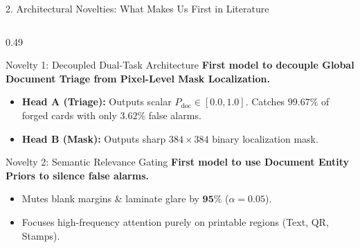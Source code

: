 \documentclass[aspectratio=169, 10pt]{beamer}
\begin{document}
\begin{frame}{2. Architectural Novelties: What Makes Us First in Literature}
  \begin{columns}[T]
    \begin{column}{0.49\textwidth}
      \begin{successbox}{Novelty 1: Decoupled Dual-Task Architecture}
        \textbf{First model to decouple Global Document Triage from Pixel-Level Mask Localization.}
        \begin{itemize}\scriptsize
          \item \textbf{Head A (Triage):} Outputs scalar $P_{\text{doc}} \in [0.0, 1.0]$. Catches $\mathbf{99.67\%}$ of forged cards with only $\mathbf{3.62\%}$ false alarms.
          \item \textbf{Head B (Mask):} Outputs sharp $384 \times 384$ binary localization mask.
        \end{itemize}
      \end{successbox}
      \vspace{1mm}
      \begin{successbox}{Novelty 2: Semantic Relevance Gating}
        \textbf{First model to use Document Entity Priors to silence false alarms.}
        \begin{itemize}\scriptsize
          \item Mutes blank margins \& laminate glare by $\mathbf{95\%}$ ($\alpha = 0.05$).
          \item Focuses high-frequency attention purely on printable regions (Text, QR, Stamps).
        \end{itemize}
      \end{successbox}
    \end{column}


\end{columns}
\end{frame}
\end{document}
